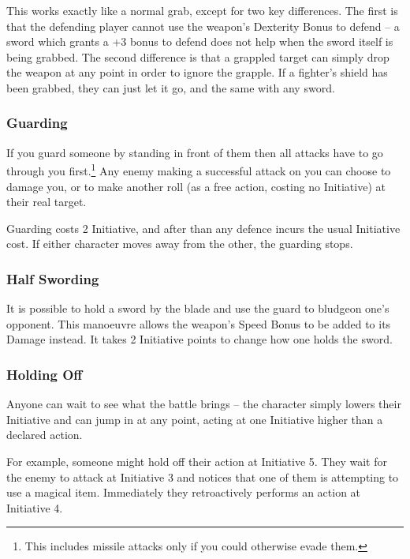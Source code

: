 \begin{multicols}{2}
This works exactly like a normal grab, except for two key differences.
The first is that the defending player cannot use the weapon's Dexterity Bonus to defend -- a sword which grants a +3 bonus to defend does not help when the sword itself is being grabbed.
The second difference is that a grappled target can simply drop the weapon at any point in order to ignore the grapple.
If a fighter's shield has been grabbed, they can just let it go, and the same with any sword.

\subsubsection{Guarding}

If you guard someone by standing in front of them then all attacks have to go through you first.\footnote{This includes missile attacks only if you could otherwise evade them.}
Any enemy making a successful attack on you can choose to damage you, or to make another roll (as a free action, costing no Initiative) at their real target.

Guarding costs 2 Initiative, and after than any defence incurs the usual Initiative cost.
If either character moves away from the other, the guarding stops.

\subsubsection{Half Swording}

It is possible to hold a sword by the blade and use the guard to bludgeon one's opponent. This manoeuvre allows the weapon's Speed Bonus to be added to its Damage instead. It takes 2 Initiative points to change how one holds the sword.

\subsubsection{Holding Off}

Anyone can wait to see what the battle brings -- the character simply lowers their Initiative and can jump in at any point, acting at one Initiative higher than a declared action.

For example, someone might hold off their action at Initiative 5. They wait for the enemy to attack at Initiative 3 and notices that one of them is attempting to use a magical item. Immediately they retroactively performs an action at Initiative 4.


\end{multicols}
